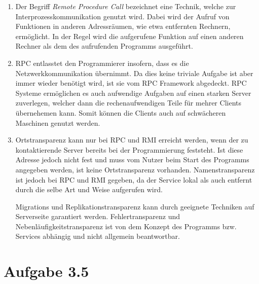 \documentclass[german,12pt,a4paper]{article}
\begin{document}
\begin{enumerate}

	\item Der Begriff \textit{Remote Procedure Call} bezeichnet eine Technik, welche zur Interprozesskommunikation genutzt wird. 
	Dabei wird der Aufruf von Funktionen in anderen Adressräumen, wie etwa entfernten Rechnern, ermöglicht. In der Regel wird die 
	aufgerufene Funktion auf einen anderen Rechner als dem des aufrufenden Programms ausgeführt.
	 
	\item RPC entlasstet den Programmierer insofern, dass es die Netzwerkkommunikation übernimmt. Da
		dies keine triviale Aufgabe ist aber immer wieder benötigt wird, ist sie vom RPC Framework
		abgedeckt. RPC Systeme ermöglichen es auch aufwendige Aufgaben auf einen starken Server
		zuverlegen, welcher dann die rechenaufwendigen Teile für mehrer Clients übernehemen kann. Somit
		können die Clients auch auf schwächeren Maschinen genutzt werden.

	\item Ortstransparenz kann nur bei RPC und RMI erreicht werden, wenn der zu kontaktierende Server
		bereits bei der Programmierung feststeht. Ist diese Adresse jedoch nicht fest und muss vom
		Nutzer beim Start des Programms angegeben werden, ist keine Ortstransparenz vorhanden.
		Namenstransparenz ist jedoch bei RPC und RMI gegeben, da der Service lokal als auch entfernt
		durch die selbe Art und Weise aufgerufen wird.

		Migrations und Replikationstransparenz kann durch geeignete Techniken auf Serverseite garantiert
		werden. Fehlertransparenz und Nebenläufigkeitstransparenz ist von dem Konzept des Programms bzw.
		Services abhängig und nicht allgemein beantwortbar.
	
\end{enumerate}

\section*{Aufgabe 3.5}
\end{document}
